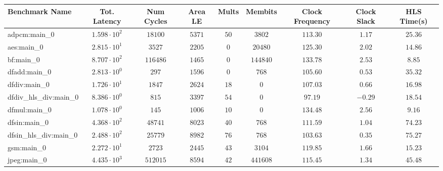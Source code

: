 \begin{tabular}{|l|c|c|c|c|c|c|c|c|}
\hline
Benchmark Name          & Tot. Latency           & Num Cycles & Area LE   & Mults   & Membits    & Clock Frequency & Clock Slack & HLS Time(s) \\
\hline
adpcm:main\_0           & $ 1.598 \cdot 10^{2} $ & $ 18100  $ & $ 5371  $ & $ 50  $ & $ 3802   $ & $ 113.30      $ & $ 1.17    $ & $ 25.36   $ \\
aes:main\_0             & $ 2.815 \cdot 10^{1} $ & $ 3527   $ & $ 2205  $ & $ 0   $ & $ 20480  $ & $ 125.30      $ & $ 2.02    $ & $ 14.86   $ \\
bf:main\_0              & $ 8.707 \cdot 10^{2} $ & $ 116486 $ & $ 1465  $ & $ 0   $ & $ 144840 $ & $ 133.78      $ & $ 2.53    $ & $ 8.85    $ \\
dfadd:main\_0           & $ 2.813 \cdot 10^{0} $ & $ 297    $ & $ 1596  $ & $ 0   $ & $ 768    $ & $ 105.60      $ & $ 0.53    $ & $ 35.32   $ \\
dfdiv:main\_0           & $ 1.726 \cdot 10^{1} $ & $ 1847   $ & $ 2624  $ & $ 18  $ & $ 0      $ & $ 107.03      $ & $ 0.66    $ & $ 16.98   $ \\
dfdiv\_hls\_div:main\_0 & $ 8.386 \cdot 10^{0} $ & $ 815    $ & $ 3397  $ & $ 54  $ & $ 0      $ & $ 97.19       $ & $ -0.29   $ & $ 18.54   $ \\
dfmul:main\_0           & $ 1.078 \cdot 10^{0} $ & $ 145    $ & $ 1006  $ & $ 10  $ & $ 0      $ & $ 134.48      $ & $ 2.56    $ & $ 9.16    $ \\
dfsin:main\_0           & $ 4.368 \cdot 10^{2} $ & $ 48741  $ & $ 8023  $ & $ 40  $ & $ 768    $ & $ 111.59      $ & $ 1.04    $ & $ 74.23   $ \\
dfsin\_hls\_div:main\_0 & $ 2.488 \cdot 10^{2} $ & $ 25779  $ & $ 8982  $ & $ 76  $ & $ 768    $ & $ 103.63      $ & $ 0.35    $ & $ 75.27   $ \\
gsm:main\_0             & $ 2.272 \cdot 10^{1} $ & $ 2723   $ & $ 2445  $ & $ 43  $ & $ 3104   $ & $ 119.85      $ & $ 1.66    $ & $ 15.23   $ \\
jpeg:main\_0            & $ 4.435 \cdot 10^{3} $ & $ 512015 $ & $ 8594  $ & $ 42  $ & $ 441608 $ & $ 115.45      $ & $ 1.34    $ & $ 45.48   $ \\

\end{tabular}
